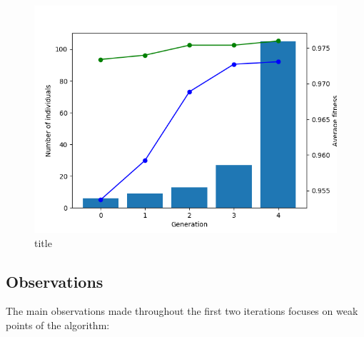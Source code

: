 \documentclass[11pt]{article}
\makeatletter
\def\maxwidth{\ifdim\Gin@nat@width>\linewidth\linewidth
    \else\Gin@nat@width\fi}
\let\Oldincludegraphics\includegraphics
\renewcommand{\includegraphics}[1]{\Oldincludegraphics[width=.8\maxwidth]{#1}}
\makeatother
\begin{document}
\begin{figure}
\centering
\includegraphics{gfx/generation-size-tne-2.png}
\caption{title}
\end{figure}

    \hypertarget{observations}{%
\subsection{Observations}\label{observations}}

The main observations made throughout the first two iterations focuses
on weak points of the algorithm:
\end{document}
